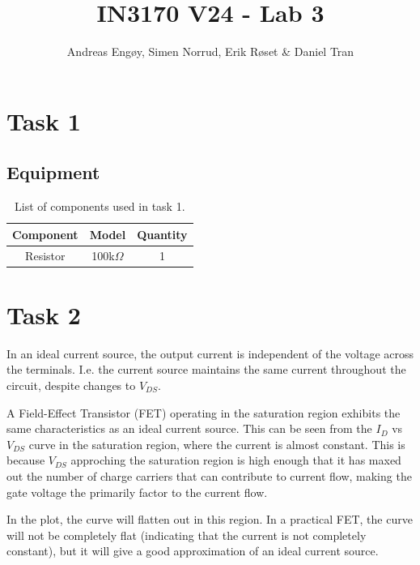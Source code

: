 \documentclass[onecolumn]{article}
\title{IN3170 V24 - Lab 3}
\author{Andreas Engøy, Simen Norrud, Erik Røset \& Daniel Tran}
\date{\monthname[\the\month] \the\year}
\begin{document}
\maketitle


\section{Task 1}
\subsection{Equipment}
\begin{table}[h]
    \centering
    \begin{tabular}{|c|c|c|}
        \hline
        \textbf{Component} & \textbf{Model} & \textbf{Quantity} \\
        \hline
        Resistor & 100k$\Omega$ & 1 \\

        \hline
    \end{tabular}
    \caption{List of components used in task 1.}
    \label{tab:bom}
\end{table}

\section{Task 2}
In an ideal current source, the output current is independent of the voltage across the terminals. I.e. the current source maintains the same current throughout the circuit, despite changes to $V_{DS}$.

A Field-Effect Transistor (FET) operating in the saturation region exhibits the same characteristics as an ideal current source. This can be seen from the $I_D$ vs $V_{DS}$ curve in the saturation region, where the current is almost constant. This is because $V_{DS}$ approching the saturation region is high enough that it has maxed out the number of charge carriers that can contribute to current flow, making the gate voltage the primarily factor to the current flow.

In the plot, the curve will flatten out in this region. In a practical FET, the curve will not be completely flat (indicating that the current is not completely constant), but it will give a good approximation of an ideal current source.
\end{document}
